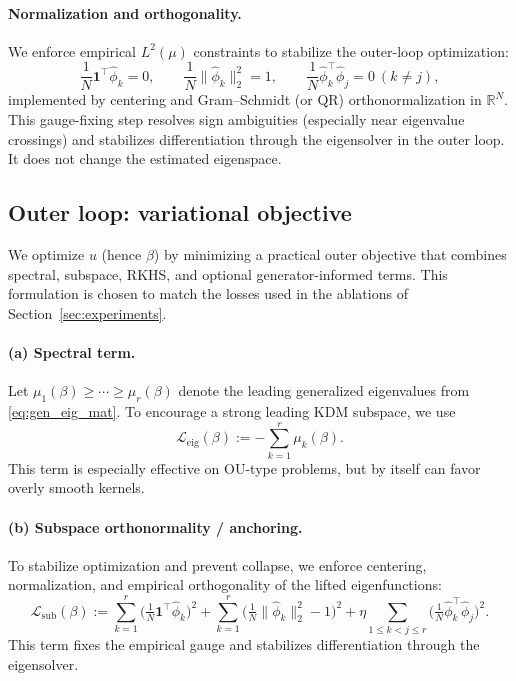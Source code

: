 \documentclass[11pt]{article}
\theoremstyle{remark}
\begin{document}
\paragraph{Normalization and orthogonality.}
We enforce empirical $L^2(\mu)$ constraints to stabilize the outer-loop optimization:
\begin{equation}
\frac{1}{N}\mathbf{1}^\top \widehat{\phi}_k = 0,
\qquad
\frac{1}{N}\|\widehat{\phi}_k\|_2^2 = 1,
\qquad
\frac{1}{N}\widehat{\phi}_k^\top \widehat{\phi}_j = 0 \ (k\neq j),
\label{eq:normalize-orth}
\end{equation}
implemented by centering and Gram--Schmidt (or QR) orthonormalization in $\mathbb{R}^N$.
This gauge-fixing step resolves sign ambiguities (especially near eigenvalue crossings) and stabilizes
differentiation through the eigensolver in the outer loop. It does not change the estimated eigenspace.

\subsection{Outer loop: variational objective}
\label{subsec:outer}

We optimize $u$ (hence $\beta$) by minimizing a practical outer objective that combines
spectral, subspace, RKHS, and optional generator-informed terms. This formulation is chosen to
match the losses used in the ablations of Section~\ref{sec:experiments}.

\paragraph{(a) Spectral term.}
Let $\mu_1(\beta)\ge \cdots \ge \mu_r(\beta)$ denote the leading generalized eigenvalues from
\eqref{eq:gen_eig_mat}. To encourage a strong leading KDM subspace, we use
\begin{equation}
\mathcal{L}_{\mathrm{eig}}(\beta) := - \sum_{k=1}^r \mu_k(\beta).
\label{eq:eig-loss}
\end{equation}
This term is especially effective on OU-type problems, but by itself can favor overly smooth kernels.

\paragraph{(b) Subspace orthonormality / anchoring.}
To stabilize optimization and prevent collapse, we enforce centering, normalization, and empirical
orthogonality of the lifted eigenfunctions:
\begin{equation}
\mathcal{L}_{\mathrm{sub}}(\beta)
:=
\sum_{k=1}^r
\Big(\tfrac{1}{N}\mathbf{1}^\top \widehat{\phi}_k\Big)^2
+
\sum_{k=1}^r
\Big(\tfrac{1}{N}\|\widehat{\phi}_k\|_2^2-1\Big)^2
+
\eta\!\!\sum_{1\le k<j\le r}
\Big(\tfrac{1}{N}\widehat{\phi}_k^\top \widehat{\phi}_j\Big)^2.
\label{eq:anchor-loss}
\end{equation}
This term fixes the empirical gauge and stabilizes differentiation through the eigensolver.
\end{document}
